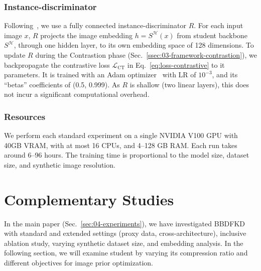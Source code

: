 \subsubsection{Instance-discriminator} \label{sssec:app01-teacherstudents-optimization-instancedisc}
\begin{foldable} %
    Following~\cite{fang2021contrastive}, we use a fully connected instance-discriminator $R$.
    For each input image $x$, $R$ projects the image embedding $h=S^{\mathcal{H}}(x)$ from student backbone $S^{\mathcal{H}}$, through one hidden layer, to its own embedding space of 128 dimensions.
    To update $R$ during the Contrastion phase (Sec.~\ref{ssec:03-framework-contrastion}), we backpropagate the contrastive loss $\mathcal{L}_{\text{CT}}$ in Eq.~\ref{eq:loss-contrastive} to it parameters.
    It is trained with an Adam optimizer~\cite{kingma2014adam} with LR of $10^{-3}$, and its ``betas'' coefficients of (0.5, 0.999).
    As $R$ is shallow (two linear layers), this does not incur a significant computational overhead.
\end{foldable}

\subsubsection{Resources} \label{sssec:app01-teacherstudents-optimization-resources}
We perform each standard experiment on a single NVIDIA V100 GPU with 40GB VRAM, with at most 16 CPUs, and 4--128 GB RAM.
Each run takes around 6--96 hours.
The training time is proportional to the model size, dataset size, and synthetic image resolution.


\section{Complementary Studies} \label{sec:app02-experiments}
\begin{foldable} %
    In the main paper (Sec.~\ref{sec:04-experiments}), we have investigated BBDFKD with standard and extended settings (proxy data, cross-architecture), inclusive ablation study, varying synthetic dataset size, and embedding analysis.
    In the following section, we will examine student by varying its compression ratio and different objectives for image prior optimization.
\end{foldable}


